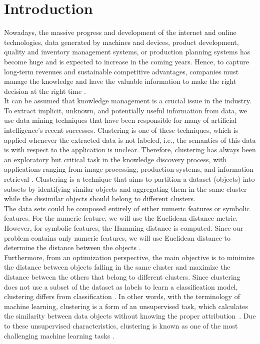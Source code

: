 \documentclass[runningheads]{llncs}
\begin{document}
\section{Introduction}
Nowadays, the massive progress and development of the internet and online technologies, data generated by machines and devices, product development, quality and inventory management systems, or production planning systems has become huge and is expected to increase in the coming years. Hence, to capture long-term revenues and sustainable competitive advantages, companies must manage the knowledge and have the valuable information to make the right decision at the right time \cite{benabdellah2019survey}. \\

It can be assumed that knowledge management is a crucial issue in the industry. To extract implicit, unknown, and potentially useful information from data, we use data mining techniques that have been responsible for many of artificial intelligence’s recent successes. 
Clustering is one of these techniques, which is applied whenever the extracted data is not labeled, i.e., the semantics of this data is with respect to the application is unclear. Therefore, clustering has always been an exploratory but critical task in the knowledge discovery process, with applications ranging from image processing, production systems, and information retrieval \cite{benabdellah2019survey}. Clustering is a technique that aims to partition a dataset (objects) into subsets by identifying similar objects and aggregating them in the same cluster while the dissimilar objects should belong to different clusters.\\

The data sets could be composed entirely of either numeric features or symbolic features. For the numeric feature, we will use the Euclidean distance metric. However, for symbolic features, the Hamming distance is computed. Since our problem contains only numeric features, we will use Euclidean distance to determine the distance between the objects \cite{aloise2009np, wagstaff2001constrained,macqueen1967some}.\\

Furthermore, from an optimization perspective, the main objective is to minimize the distance between objects falling in the same cluster and maximize the distance between the others that belong to different clusters. Since clustering does not use a subset of the dataset as labels to learn a classification model, clustering differs from classification \cite{wagstaff2001constrained}. In other words, with the terminology of machine learning, clustering is a form of an unsupervised task, which calculates the similarity between data objects without knowing the proper attribution~\cite{li2018geometric}. Due to these unsupervised characteristics, clustering is known as one of the most challenging machine learning tasks \cite{benabdellah2019survey}. \\
\end{document}
